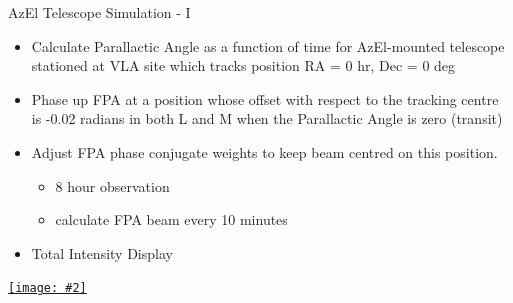 \documentclass[pdf,azure,slideColor,colorBG]{prosper}
\newcommand{\moviewithpreview}[3]{%
    \pdfmark[{\texttt{[image: \#2]}}]{%
    pdfmark=/ANN,Subtype=/Movie,Movie=<< /F (#3) >>,%
    Activation=<< /ShowControls true /Mode /Repeat >>}}
\newcommand{\movie}[3]{%
    \pdfmark[{\hbox to #1 {\vbox to #2 { }}}]{%
    pdfmark=/ANN,Subtype=/Movie,Movie=<< /F (#3) /Poster true >>,%
    Activation=<< /ShowControls true /Mode /Repeat >>}}
\newcommand{\hrefWithPreview}[3]{%
  \href{#3}{\texttt{[image: \#2]}}
}
\begin{document}

\begin{slide} {AzEl Telescope Simulation - I}
\begin{small}
\begin{itemize}
\item Calculate Parallactic Angle as a function of time for AzEl-mounted
telescope stationed at VLA site which tracks position RA = 0 hr, Dec = 0 deg
\item Phase up FPA at a position whose offset with respect to the
tracking centre is -0.02 radians in both L and M when the Parallactic Angle is zero (transit)
\item Adjust FPA phase conjugate weights to keep beam centred on this
position.
\begin{itemize}
\item 8 hour observation
\item calculate FPA beam every 10 minutes
\end{itemize}
\item Total Intensity Display
\end{itemize}
\end {small}
   \begin{center}
      \hrefWithPreview{3cm}{I_azel_1.ps}{run:movies/I_azel.gif}
   \end{center}
\end{slide}

\end{document}

